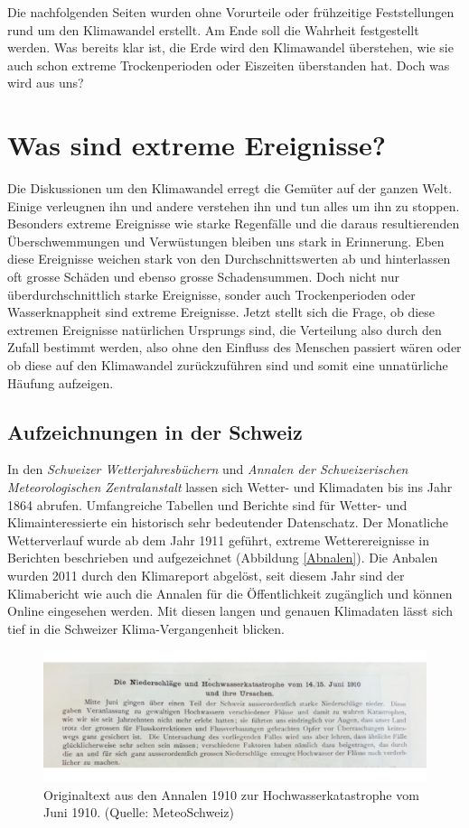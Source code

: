 \begin{refsection}
Die nachfolgenden Seiten wurden ohne Vorurteile oder frühzeitige Feststellungen rund um den Klimawandel erstellt. Am Ende soll die Wahrheit festgestellt werden.
Was bereits klar ist, die Erde wird den Klimawandel überstehen, wie sie auch schon extreme Trockenperioden oder Eiszeiten überstanden hat. Doch was wird aus uns?


\section{Was sind extreme Ereignisse?}
Die Diskussionen um den Klimawandel erregt die Gemüter auf der ganzen Welt. Einige verleugnen ihn und andere verstehen ihn und tun alles um ihn zu stoppen. Besonders extreme Ereignisse wie starke Regenfälle und die daraus resultierenden Überschwemmungen und Verwüstungen bleiben uns stark in Erinnerung.
Eben diese Ereignisse weichen stark von den Durchschnittswerten ab und hinterlassen oft grosse Schäden und ebenso grosse Schadensummen. Doch nicht nur überdurchschnittlich starke Ereignisse, sonder auch  Trockenperioden oder Wasserknappheit sind extreme Ereignisse. 
Jetzt stellt sich die Frage, ob diese extremen Ereignisse natürlichen Ursprungs sind, die Verteilung also durch den Zufall bestimmt werden, also ohne den Einfluss des Menschen passiert wären oder ob diese auf den Klimawandel zurückzuführen sind und somit eine unnatürliche Häufung aufzeigen.


\subsection{Aufzeichnungen in der Schweiz}
In den \textit{Schweizer Wetterjahresbüchern} und \textit{Annalen der Schweizerischen Meteorologischen Zentralanstalt} lassen sich Wetter- und Klimadaten bis ins Jahr 1864 abrufen. Umfangreiche Tabellen und Berichte sind für Wetter- und Klimainteressierte ein historisch sehr bedeutender Datenschatz. 
Der Monatliche Wetterverlauf wurde ab dem Jahr 1911 geführt, extreme Wetterereignisse in Berichten beschrieben und aufgezeichnet (Abbildung \ref{Abnalen}). Die Anbalen wurden 2011 durch den Klimareport abgelöst, seit diesem Jahr sind der Klimabericht wie auch die Annalen für die Öffentlichkeit zugänglich und können Online eingesehen werden.
Mit diesen langen und genauen Klimadaten lässt sich tief in die Schweizer Klima-Vergangenheit blicken.

\begin{figure}
\centering
\includegraphics[width=\hsize]{extrem/Annalen.jpg}
\caption{Originaltext aus den Annalen 1910 zur Hochwasserkatastrophe vom Juni 1910. (Quelle: MeteoSchweiz)}
\label{Annalen}
\end{figure}



\end{refsection}
